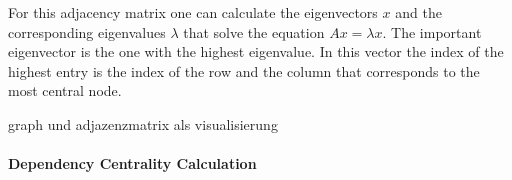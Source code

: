 For this adjacency matrix one can calculate the eigenvectors $x$ and the corresponding 
eigenvalues $ \lambda $ that solve the equation $Ax = \lambda x$. The important eigenvector is the one 
with the highest eigenvalue. In this vector the index of the highest entry is the 
index of the row and the column that corresponds to the most central node.

graph und adjazenzmatrix als visualisierung

\paragraph{Dependency Centrality Calculation}\mbox{} \medskip \\